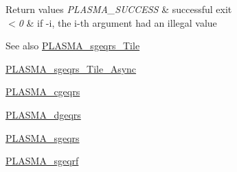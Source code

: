 \begin{DoxyRetVals}{Return values}
{\em P\+L\+A\+S\+M\+A\+\_\+\+S\+U\+C\+C\+E\+S\+S} & successful exit \\
\hline
{\em $<$0} & if -\/i, the i-\/th argument had an illegal value\\
\hline
\end{DoxyRetVals}
\begin{DoxySeeAlso}{See also}
\hyperlink{group__float__Tile_ga9f069cadfcd63ff8013e2e25079830d0_ga9f069cadfcd63ff8013e2e25079830d0}{P\+L\+A\+S\+M\+A\+\_\+sgeqrs\+\_\+\+Tile} 

\hyperlink{group__float__Tile__Async_ga481b8b15be614dc287fb42b0f6a71141_ga481b8b15be614dc287fb42b0f6a71141}{P\+L\+A\+S\+M\+A\+\_\+sgeqrs\+\_\+\+Tile\+\_\+\+Async} 

\hyperlink{group__PLASMA__Complex32__t_ga961a4dfc433c5086670b813e5fa53bbf_ga961a4dfc433c5086670b813e5fa53bbf}{P\+L\+A\+S\+M\+A\+\_\+cgeqrs} 

\hyperlink{group__double_gaa133b69ef592ef01466fd93b6ac7689d_gaa133b69ef592ef01466fd93b6ac7689d}{P\+L\+A\+S\+M\+A\+\_\+dgeqrs} 

\hyperlink{group__float_ga15cad3c163c8d1137d13d66594652b7d_ga15cad3c163c8d1137d13d66594652b7d}{P\+L\+A\+S\+M\+A\+\_\+sgeqrs} 

\hyperlink{group__float_gad2dff40bb75ba6ee7a91306e0a3e889e_gad2dff40bb75ba6ee7a91306e0a3e889e}{P\+L\+A\+S\+M\+A\+\_\+sgeqrf} 
\end{DoxySeeAlso}
\hypertarget{group__float_gad5f1778952268ef575d41e6bfcc7c7b4_gad5f1778952268ef575d41e6bfcc7c7b4}{}
